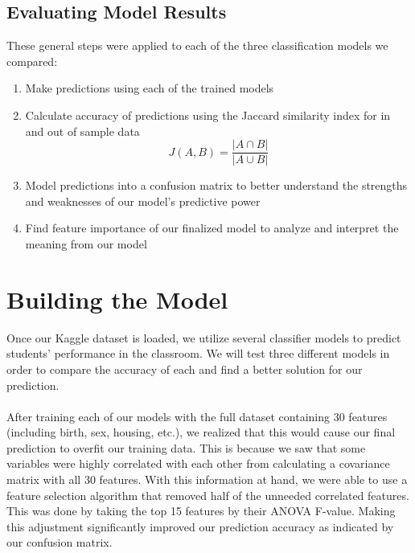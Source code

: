 \documentclass[twoside,twocolumn]{article}
\begin{document}
\subsection{Evaluating Model Results}
These general steps were applied to each of the three classification models we compared:
\begin{enumerate}
	\item Make predictions using each of the trained models
	\item Calculate accuracy of predictions using the Jaccard similarity index for in and out of sample data
	\begin{equation}
	\label{eq:emc}
	J(A,B) = \frac{|{A}\cap{B}|}{|{A}\cup{B}|}
	\end{equation}
	\item Model predictions into a confusion matrix to better understand the strengths and weaknesses of our model’s predictive power
	\item Find feature importance of our finalized model to analyze and interpret the meaning from our model
\end {enumerate}



\section{Building the Model}
Once our Kaggle dataset is loaded, we utilize several classifier models to predict students’ performance in the classroom. We will test three different models in order to compare the accuracy of each and find a better solution for our prediction. 
\\ \\
After training each of our models with the full dataset containing 30 features (including birth, sex, housing, etc.), we realized that this would cause our final prediction to overfit our training data. This is because we saw that some variables were highly correlated with each other from calculating a covariance matrix with all 30 features. With this information at hand, we were able to use a feature selection algorithm that removed half of the unneeded correlated features. This was done by taking the top 15 features by their ANOVA F-value. Making this adjustment significantly improved our prediction accuracy as indicated by our confusion matrix.
\end{document}

